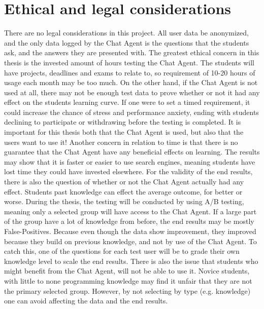 \chapter{Ethical and legal considerations}
\label{chapter8:ethical_legal_considerations}
There are no legal considerations in this project. All user data be anonymized, and the only data logged by the Chat Agent is the questions that the students ask, and the answers 
they are presented with. The greatest ethical concern in this thesis is the invested amount of hours testing the Chat Agent. The students will have projects, deadlines and exams 
to relate to, so requirement of 10-20 hours of usage each month may be too much. On the other hand, if the Chat Agent is not used at all, there may not be enough test data to prove 
whether or not it had any effect on the students learning curve. If one were to set a timed requirement, it could increase the chance of stress and performance anxiety, ending with 
students declining to participate or withdrawing before the testing is completed. It is important for this thesis both that the Chat Agent is used, but also that the users want to 
use it! Another concern in relation to time is that there is no guarantee that the Chat Agent have any beneficial effects on learning. The results may show that it is faster or 
easier to use search engines, meaning students have lost time they could have invested elsewhere.
\vspace{0.5em}\newline
For the validity of the end results, there is also the question of whether or not the Chat Agent actually had any effect. Students past knowledge can effect the average outcome, 
for better or worse. During the thesis, the testing will be conducted by using A/B testing, meaning only a selected group will have access to the Chat Agent. If a large part of the 
group have a lot of knowledge from before, the end results may be mostly False-Positives. Because even though the data show improvement, they improved because they build on previous 
knowledge, and not by use of the Chat Agent. To catch this, one of the questions for each test user will be to grade their own knowledge level to scale the end results. There is 
also the issue that students who might benefit from the Chat Agent, will not be able to use it. Novice students, with little to none programming knowledge may find it unfair that 
they are not the primary selected group. However, by not selecting by type (e.g. knowledge) one can avoid affecting the data and the end results.
